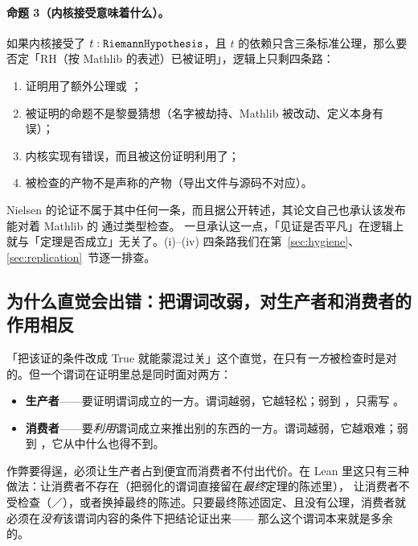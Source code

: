 \paragraph{命题 3（内核接受意味着什么）。}如果内核接受了 $t : \text{\texttt{RiemannHypothesis}}$，且 $t$ 的依赖只含三条标准公理，那么要否定「RH（按 Mathlib 的表述）已被证明」，逻辑上只剩四条路：

\begin{enumerate}[label=(\roman*)]
\item 证明用了额外公理或 ；
\item 被证明的命题不是黎曼猜想（名字被劫持、Mathlib 被改动、定义本身有误）；
\item 内核实现有错误，而且被这份证明利用了；
\item 被检查的产物不是声称的产物（导出文件与源码不对应）。
\end{enumerate}

Nielsen 的论证不属于其中任何一条，而且据公开转述，其论文自己也承认该发布能对着 Mathlib 的  通过类型检查。
一旦承认这一点，「见证是否平凡」在逻辑上就与「定理是否成立」无关了。(i)–(iv) 四条路我们在第~\ref{sec:hygiene}、\ref{sec:replication}~节逐一排查。

\subsection{为什么直觉会出错：把谓词改弱，对生产者和消费者的作用相反}

「把该证的条件改成 True 就能蒙混过关」这个直觉，在只有\emph{一方}被检查时是对的。但一个谓词在证明里总是同时面对两方：

\begin{itemize}
\item \textbf{生产者}——要证明谓词成立的一方。谓词越弱，它越轻松；弱到 ，只需写 。
\item \textbf{消费者}——要\emph{利用}谓词成立来推出别的东西的一方。谓词越弱，它越艰难；弱到 ，它从中什么也得不到。
\end{itemize}

作弊要得逞，必须让生产者占到便宜而消费者不付出代价。在 Lean 里这只有三种做法：让消费者不存在（把弱化的谓词直接留在\emph{最终}定理的陈述里），
让消费者不受检查（／），或者换掉最终的陈述。只要最终陈述固定、且没有公理，消费者就必须在\emph{没有}该谓词内容的条件下把结论证出来——
那么这个谓词本来就是多余的。

